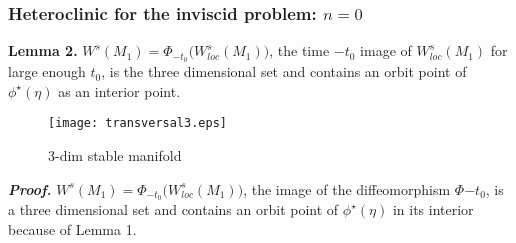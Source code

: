 \documentclass{beamer}
\def\blue{\color{blue}}
\begin{document}
\begin{frame}
 \frametitle{Heteroclinic for the inviscid problem: $n=0$}
 {\bf Lemma 2.} $W^s(M_1) = \Phi_{-t_0}\big(W^s_{loc}(M_1)\big)$, the time $-t_0$ image of $W^s_{loc}(M_1)$ for large enough $t_0$, is the three dimensional set and contains an orbit point of $\phi^\star(\eta)$ as an interior point.
   \begin{figure}
  \centering
    \texttt{[image: transversal3.eps]}
    \caption{3-dim stable manifold}
 \end{figure}
 \vskip -15pt
 {\scriptsize
 {\bf \it Proof.}
  $W^s(M_1) = \Phi_{-t_0}\big(W^s_{loc}(M_1)\big)$, the image of the diffeomorphism $\Phi{-t_0}$, is a three dimensional set and contains an orbit point of $\phi^\star(\eta)$ in its interior because of Lemma 1.
 }
\end{frame}


\end{document}
